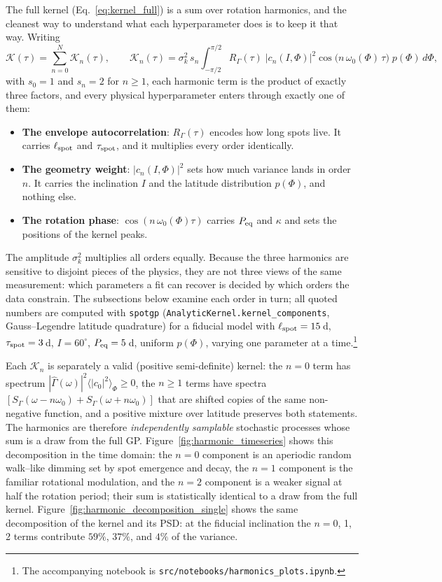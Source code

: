 \documentclass[preprint]{aastex702}
\newcommand{\FT}[1]{\hat{#1}}
\newcommand{\code}[1]{{\texttt{#1}}}
\begin{document}
The full kernel (Eq.~\ref{eq:kernel_full}) is a sum over rotation harmonics, and the cleanest way to understand what each hyperparameter does is to keep it that way. Writing
\begin{equation}
    \mathcal{K}(\tau) = \sum_{n=0}^{N} \mathcal{K}_n(\tau),
    \qquad
    \mathcal{K}_n(\tau) = \sigma_k^2\, s_n \int_{-\pi/2}^{\pi/2} R_\Gamma(\tau)\; |c_n(I,\Phi)|^2 \cos\!\big(n\,\omega_0(\Phi)\,\tau\big)\; p(\Phi)\, d\Phi,
    \label{eq:kernel_harmonic_sum}
\end{equation}
with $s_0 = 1$ and $s_n = 2$ for $n \geq 1$, each harmonic term is the product of exactly three factors, and every physical hyperparameter enters through exactly one of them:
\begin{itemize}[nosep]
    \item \textbf{The envelope autocorrelation}: $R_\Gamma(\tau)$ encodes how long spots live. It carries $\ell_{\rm spot}$ and $\tau_{\rm spot}$, and it multiplies every order identically.
    \item \textbf{The geometry weight}: $|c_n(I,\Phi)|^2$ sets how much variance lands in order $n$. It carries the inclination $I$ and the latitude distribution $p(\Phi)$, and nothing else.
    \item \textbf{The rotation phase}: $\cos(n\,\omega_0(\Phi)\tau)$ carries $P_{\rm eq}$ and $\kappa$ and sets the positions of the kernel peaks.
\end{itemize}
The amplitude $\sigma_k^2$ multiplies all orders equally. Because the three harmonics are sensitive to disjoint pieces of the physics, they are not three views of the same measurement: which parameters a fit can recover is decided by which orders the data constrain. The subsections below examine each order in turn; all quoted numbers are computed with \code{spotgp} (\code{AnalyticKernel.kernel\_components}, Gauss--Legendre latitude quadrature) for a fiducial model with $\ell_{\rm spot} = 15$\,d, $\tau_{\rm spot} = 3$\,d, $I = 60^\circ$, $P_{\rm eq} = 5$\,d, uniform $p(\Phi)$, varying one parameter at a time.\footnote{The accompanying notebook is \texttt{src/notebooks/harmonics\_plots.ipynb}.}

Each $\mathcal{K}_n$ is separately a valid (positive semi-definite) kernel: the $n = 0$ term has spectrum $|\FT{\Gamma}(\omega)|^2 \langle|c_0|^2\rangle_\Phi \geq 0$, the $n \geq 1$ terms have spectra $[S_\Gamma(\omega - n\omega_0) + S_\Gamma(\omega + n\omega_0)]$ that are shifted copies of the same non-negative function, and a positive mixture over latitude preserves both statements. The harmonics are therefore \emph{independently samplable} stochastic processes whose sum is a draw from the full GP. Figure~\ref{fig:harmonic_timeseries} shows this decomposition in the time domain: the $n = 0$ component is an aperiodic random walk--like dimming set by spot emergence and decay, the $n = 1$ component is the familiar rotational modulation, and the $n = 2$ component is a weaker signal at half the rotation period; their sum is statistically identical to a draw from the full kernel. Figure~\ref{fig:harmonic_decomposition_single} shows the same decomposition of the kernel and its PSD: at the fiducial inclination the $n = 0$, 1, 2 terms contribute $59\%$, $37\%$, and $4\%$ of the variance.
\end{document}
